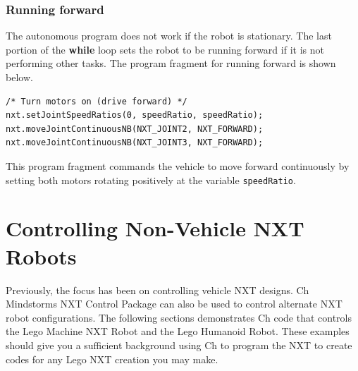 \documentclass[11pt]{article}
\begin{document}
\subsubsection*{Running forward}
The autonomous program does not work if the robot is stationary. The last portion of the 
{\bf while} loop sets the robot to be running forward if it is not performing other tasks.
The program fragment for running forward is shown below.
\begin{lstlisting}
/* Turn motors on (drive forward) */
nxt.setJointSpeedRatios(0, speedRatio, speedRatio);
nxt.moveJointContinuousNB(NXT_JOINT2, NXT_FORWARD);
nxt.moveJointContinuousNB(NXT_JOINT3, NXT_FORWARD);
\end{lstlisting}
This program fragment commands the vehicle to move forward continuously by setting both motors 
rotating positively at the variable {\tt speedRatio}.

\newpage
\section{Controlling Non-Vehicle NXT Robots}
Previously, the focus has been on controlling vehicle NXT designs. Ch Mindstorms NXT Control 
Package can also be used to control alternate NXT robot configurations. The following sections 
demonstrates Ch code that controls the Lego Machine NXT Robot and the Lego Humanoid Robot. These 
examples should give you a sufficient background using Ch to program the NXT to create codes 
for any Lego NXT creation you may make.
\end{document}
